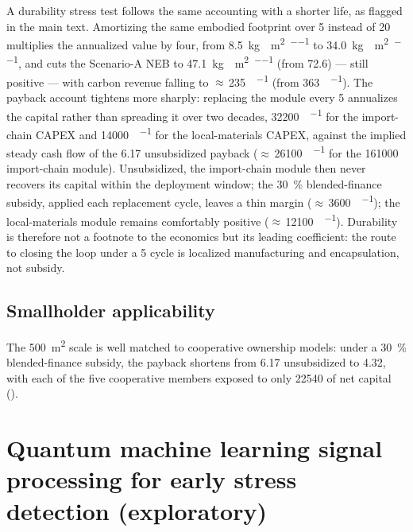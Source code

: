 \documentclass[11pt,a4paper]{article}
\begin{document}
A durability stress test follows the same accounting with a shorter life, as flagged in the main text. Amortizing the same embodied footprint over \qty{5}{\yr} instead of \qty{20}{\yr} multiplies the annualized value by four, from \qty{8.5}{\kg{}\per\m\squared\per\yr} to \qty{34.0}{\kg{}\per\m\squared\per\yr}, and cuts the Scenario-A NEB to \qty{47.1}{\kg{}\per\m\squared\per\yr} (from \num{72.6}) --- still positive --- with carbon revenue falling to $\approx$\,\qty{235}{\USD\per\yr} (from \qty{363}{\USD\per\yr}). The payback account tightens more sharply: replacing the module every \qty{5}{\yr} annualizes the capital rather than spreading it over two decades, \qty{32200}{\USD\per\yr} for the import-chain CAPEX and \qty{14000}{\USD\per\yr} for the local-materials CAPEX, against the implied steady cash flow of the \qty{6.17}{\yr} unsubsidized payback ($\approx$\,\qty{26100}{\USD\per\yr} for the \qty{161000}{\USD} import-chain module). Unsubsidized, the import-chain module then never recovers its capital within the deployment window; the \qty{30}{\percent} blended-finance subsidy, applied each replacement cycle, leaves a thin margin ($\approx$\,\qty{3600}{\USD\per\yr}); the local-materials module remains comfortably positive ($\approx$\,\qty{12100}{\USD\per\yr}). Durability is therefore not a footnote to the economics but its leading coefficient: the route to closing the loop under a \qty{5}{\yr} cycle is localized manufacturing and encapsulation, not subsidy.

\subsection{Smallholder applicability}

The \qty{500}{\m\squared} scale is well matched to cooperative ownership models: under a \qty{30}{\percent} blended-finance subsidy, the payback shortens from \qty{6.17}{\yr} unsubsidized to \qty{4.32}{\yr}, with each of the five cooperative members exposed to only \qty{22540}{\USD} of net capital ().


\section{Quantum machine learning signal processing for early stress detection (exploratory)}
\label{SI-sec:qml}
\end{document}
